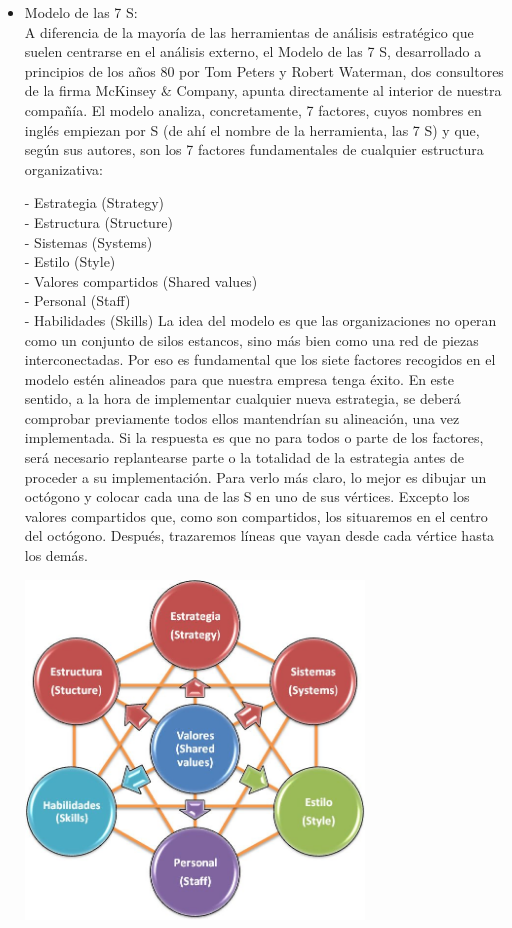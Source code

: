 	\begin{itemize}
\item Modelo de las 7 S:
\\A diferencia de la mayoría de las herramientas de análisis estratégico que suelen centrarse en el análisis externo, el Modelo de las 7 S, desarrollado a principios de los años 80 por Tom Peters y Robert Waterman, dos consultores de la firma McKinsey & Company, apunta directamente al interior de nuestra compañía. El modelo analiza, concretamente, 7 factores, cuyos nombres en inglés empiezan por S (de ahí el nombre de la herramienta, las 7 S) y que, según sus autores, son los 7 factores fundamentales de cualquier estructura organizativa:

- Estrategia (Strategy)\\
- Estructura (Structure)\\
- Sistemas (Systems)\\
- Estilo (Style)\\
- Valores compartidos (Shared values)\\
- Personal (Staff)\\
- Habilidades (Skills)
La idea del modelo es que las organizaciones no operan como un conjunto de silos estancos, sino más bien como una red de piezas interconectadas. Por eso es fundamental que los siete factores recogidos en el modelo estén alineados para que nuestra empresa tenga éxito. En este sentido, a la hora de implementar cualquier nueva estrategia, se deberá comprobar previamente todos ellos mantendrían su alineación, una vez implementada. Si la respuesta es que no para todos o parte de los factores, será necesario replantearse parte o la totalidad de la estrategia antes de proceder a su implementación. Para verlo más claro, lo mejor es dibujar un octógono y colocar cada una de las S en uno de sus vértices. Excepto los valores compartidos que, como son compartidos, los situaremos en el centro del octógono. Después, trazaremos líneas que vayan desde cada vértice hasta los demás.
		\begin{center}
		\includegraphics[width=9cm]{./Imagenes/Imagen4}
		\end{center}
	\end{itemize}
	
